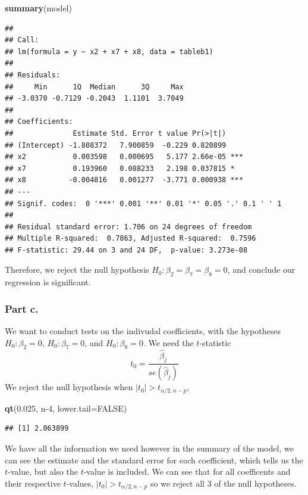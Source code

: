 \documentclass[
  11pt,
]{article}
\newenvironment{Shaded}{\begin{snugshade}}{\end{snugshade}}
\newcommand{\AttributeTok}[1]{\textcolor[rgb]{0.13,0.29,0.53}{#1}}
\newcommand{\ConstantTok}[1]{\textcolor[rgb]{0.56,0.35,0.01}{#1}}
\newcommand{\DecValTok}[1]{\textcolor[rgb]{0.00,0.00,0.81}{#1}}
\newcommand{\FloatTok}[1]{\textcolor[rgb]{0.00,0.00,0.81}{#1}}
\newcommand{\FunctionTok}[1]{\textcolor[rgb]{0.13,0.29,0.53}{\textbf{#1}}}
\newcommand{\NormalTok}[1]{#1}
\begin{document}
\begin{Shaded}
\begin{Highlighting}[]
\FunctionTok{summary}\NormalTok{(model)}
\end{Highlighting}
\end{Shaded}

\begin{verbatim}
## 
## Call:
## lm(formula = y ~ x2 + x7 + x8, data = tableb1)
## 
## Residuals:
##     Min      1Q  Median      3Q     Max 
## -3.0370 -0.7129 -0.2043  1.1101  3.7049 
## 
## Coefficients:
##              Estimate Std. Error t value Pr(>|t|)    
## (Intercept) -1.808372   7.900859  -0.229 0.820899    
## x2           0.003598   0.000695   5.177 2.66e-05 ***
## x7           0.193960   0.088233   2.198 0.037815 *  
## x8          -0.004816   0.001277  -3.771 0.000938 ***
## ---
## Signif. codes:  0 '***' 0.001 '**' 0.01 '*' 0.05 '.' 0.1 ' ' 1
## 
## Residual standard error: 1.706 on 24 degrees of freedom
## Multiple R-squared:  0.7863, Adjusted R-squared:  0.7596 
## F-statistic: 29.44 on 3 and 24 DF,  p-value: 3.273e-08
\end{verbatim}

Therefore, we reject the null hypothesis
\(H_0: \beta_2 = \beta_7 = \beta_8 = 0\), and conclude our regression is
significant.

\subsubsection{Part c.}\label{part-c.-1}

We want to conduct tests on the indivudal coefficients, with the
hypotheses \(H_0: \beta_2 = 0\), \(H_0: \beta_7 = 0\), and
\(H_0: \beta_8 = 0\). We need the \(t\)-statistic
\[t_0 = \frac{\hat{\beta}_j}{se(\hat{\beta}_j)}\] We reject the null
hypothesis when \(|t_0| > t_{\alpha/2, n-p}\),

\begin{Shaded}
\begin{Highlighting}[]
\FunctionTok{qt}\NormalTok{(}\FloatTok{0.025}\NormalTok{, n}\DecValTok{{-}4}\NormalTok{, }\AttributeTok{lower.tail=}\ConstantTok{FALSE}\NormalTok{)}
\end{Highlighting}
\end{Shaded}

\begin{verbatim}
## [1] 2.063899
\end{verbatim}

We have all the information we need however in the summary of the model,
we can see the estimate and the standard error for each coefficient,
which tells us the \(t\)-value, but also the \(t\)-value is included. We
can see that for all coefficents and their respective \(t\)-values,
\(|t_0| > t_{\alpha/2, n-p}\) so we reject all 3 of the null hypotheses.
\end{document}

